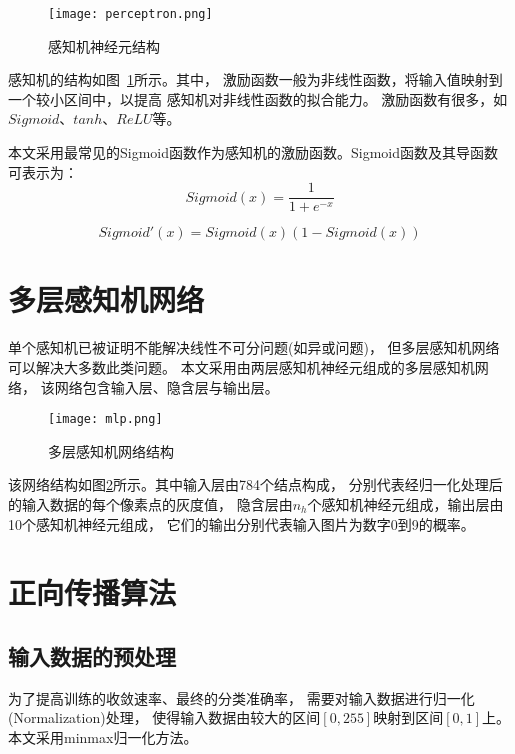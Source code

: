 \documentclass[forprint]{WHUBachelor}
\begin{document}
     \begin{figure}[ht]
       \centering
         \texttt{[image: perceptron.png]}
         \caption{感知机神经元结构}
         \label{fig:1}
     \end{figure}
   
     感知机的结构如图~\ref{fig:1}所示。其中，
     激励函数一般为非线性函数，将输入值映射到一个较小区间中，以提高
     感知机对非线性函数的拟合能力。
     激励函数有很多，如$Sigmoid$、$tanh$、$ReLU$等。
   
     本文采用最常见的Sigmoid函数作为感知机的激励函数。Sigmoid函数及其导函数可表示为：
     \begin{equation}
       Sigmoid(x)=\frac{1}{1+e^{-x}}
     \end{equation}
   
     \begin{equation}
       Sigmoid'(x)=Sigmoid(x)(1-Sigmoid(x))
     \end{equation}
     
     \section{多层感知机网络}
   
     单个感知机已被证明不能解决线性不可分问题(如异或问题)，
     但多层感知机网络可以解决大多数此类问题。
     本文采用由两层感知机神经元组成的多层感知机网络，
     该网络包含输入层、隐含层与输出层。
   
     \begin{figure}[ht]
       \centering
         \texttt{[image: mlp.png]}
         \caption{多层感知机网络结构}
         \label{fig:2}
     \end{figure}
   
     该网络结构如图\ref{fig:2}所示。其中输入层由784个结点构成，
     分别代表经归一化处理后的输入数据的每个像素点的灰度值，
     隐含层由$n_h$个感知机神经元组成，输出层由10个感知机神经元组成，
     它们的输出分别代表输入图片为数字0到9的概率。
   
     \section{正向传播算法}
       
       \subsection{输入数据的预处理}
       
         为了提高训练的收敛速率、最终的分类准确率，
         需要对输入数据进行归一化(Normalization)处理，
         使得输入数据由较大的区间$[0,255]$映射到区间$[0,1]$上。
         本文采用minmax归一化方法。
   
\end{document}
